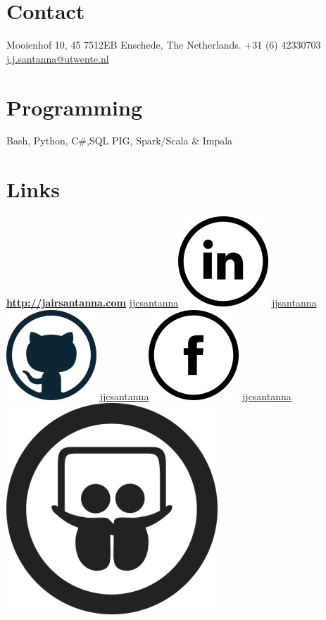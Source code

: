 \documentclass[print]{friggeri-cv} %
\begin{document}

\begin{aside} 
 \section{Contact}
	Mooienhof 10, 45
	7512EB Enschede,
	The Netherlands.
	+31 (6) 42330703
	\href{mailto:j.j.santanna@utwente.nl}{j.j.santanna@utwente.nl}
~
\section{Programming}
	Bash, Python, C\#,SQL
	PIG, Spark/Scala \& Impala
~
\section{Links}
	\href{http://jairsantanna.com}{\textbf{http://jairsantanna.com}}
	\href{https://www.linkedin.com/in/jjcsantanna}{jjcsantanna}\includegraphics[scale=0.2]{img/linkedin.png}
	\href{https://github.com/jjsantanna}{jjsantanna\includegraphics[scale=0.2]{img/github.png}}
    \href{https://www.facebook.com/jjcsantanna}{jjcsantanna}\includegraphics[scale=0.2]{img/facebook.png}
    \href{http://www.slideshare.net/jjcsantanna}{jjcsantanna}\includegraphics[scale=0.08]{img/slideshare.png}
~

\end{aside}
\end{document}
